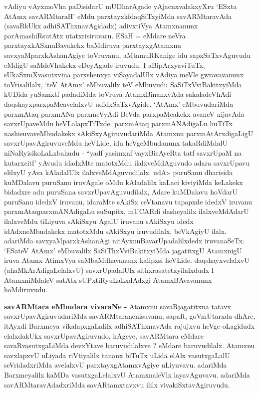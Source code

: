 \begin{artha}
vAdiyu vAyxmoVha paDisidarU mUDharAgade yAjacnxvalakxyXru `ESxta AtAmx savARMtaraH' eMdu parxtayxkfdaqSiTxyiMda savARMtaravAda (savaRkUkx adhiSAThxna\break vAgidadx) adivxtiVya Atamxnanunx parAmashiRsutAtx utatxrisiruvaru. ESaH = \-eMdare neVra parxtayxkASxnuBavakekx baMdiruva parxtayxgAtamxnu savxyaMparxkAshanAgiye toVruvanu, aMtamuRKanige idu sapxSaTxvAguvudu eMdigU saMdeVhakekx eDeyAgade \-iruvudu. I aBipArxyaviTuTx, sUkaSxmXvasutxvina parxshenxya viSayadalUlx vAdiya meVle gwrava\-vanunx toVrisalilalx, `teV AtAmx' eMbuvalilx teV eMbuvudu SaSiTxVviBakitxyiMda \-kUDida yuSamxtf padadiMda toVruva AtamxBinanxvAda sakaladeVhAdi daqshayxparxpaMca\-velalxvU udidxSaTxvAgide. `AtAmx' eMbuvudariMda parxmAtaq parxmANa parxmeVyAdi BeVda parxpaMcakekx avaneV nijavAda savxrUpaveMdu heVLalapxTiTxde. parxmAtaq parxmANAdi\-gaLu huTiTx nashisuvaveMbudakekx sAkiSxyAgiruvudariMda Atamxnu parxmAtArxdigaLigU savxrUpavAgiruvuveMdu heVLide, idu heVgeMbudanunx takaRdiMdalU niNaRyisi\-koLaLxbahudu - ``yadf yasimxnf vayxBicAyeRta tatf savxrUpaM na kutarxcitf' \-yAvudu idadxMte matotxMdu ilalxveMdAguvudo adara savxrUpavu elilxyU yAva kAladalUlx ilalxveMdAguvudilalx. udA:- puruSanu dharisida kuMDalavu puruSanu iruvAgale oMdu kAladalilx kaLaci kiviyiMda keLakekx bidadxre adu puruSa\-na savxrUpavAguvudilalx, Adare kuMDalavu hoVdarU puruSanu idedxV iruvanu, idaraMte sAkiSx ceVtanavu tapapxde idedxV iruvanu parxmAtaqparxmANAdigaLu suSupitx, mUCARdi dasheyalilx ilalxveMdAdarU ilalxveMdu tiLiyuva sAkiSxyu AgalU iruvanu sAkiSxyu idedx idAdxneMbudakekx matotxMdu sAkiSxyu iruvudilalx, beVkA\-giyU ilalx. adariMda savxyaMparxkAshanAgi nitAyxnuBavarUpadalilxdedx iruvanaSeTx. `ESateV AtAmx' eMbuvalilx SaSiThxVviBakitxyiMda jagatitxgU AtamxnigU iruva Atamx \-AtimxVya saMbaMdhavanunx kalipxsi heVLide. daqshayxvelalxvU (ahaMkArAdigaLelalxvU) \-savxrUpadalUlx sithxrasatetxyilalxdudx I AtamxniMdaleV satAtx sUPxtiRyuLaLxdAdxgi AtamxBAva\-vanunx hoMdiruvudu.
\end{artha}

\begin{artha}
{\bf savARMtara eMbudara vivaraNe -} Atamxnu savaRjagatitxna tatavx savxrUpavAgiruvu\-dariMda savARMtaranenisuvanu, sapaR, goVmUtarxda dhAre, itAyxdi Barxmeya \-vikalapxgaLalilx adhiSAThxnavAda rajujxvu heVge oLagidudx elalxdakUkx savxrUpavAgiruvudo, \-hAgeye, savARMtara eMdare savaRvasutxgaLiMda devxYtave baruvudilalxve ? \-eMdare baruvudilalx. Atamxnu savxlapxvU uLiyada riVtiyalilx tananx biTuTx uLida elAlx vasutx\-gaLalU seVridadxriMda avelalxvU parxtayxgAtamxvAgiye uLiyuvavu. adariMda Barxme\-yalilx kaMDa vasutxgaLelalxvU AtamxnaleVlx layavAguvavu. adariMda savARMtaravAdadx\-riMda savARtamxtavxvu ililx vivakiSxtavAgiruvudu. 
\end{artha}

